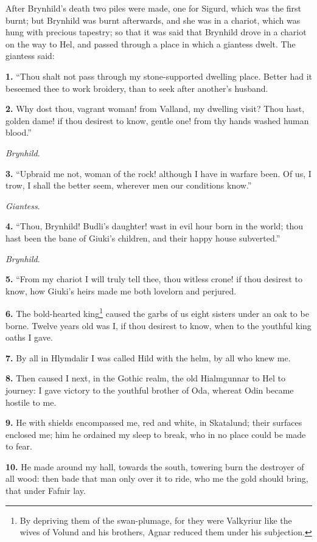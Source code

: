 
After Brynhild's death two piles were made, one for Sigurd, which was
the first burnt; but Brynhild was burnt afterwards, and she was in a
chariot, which was hung with precious tapestry; so that it was said
that Brynhild drove in a chariot on the way to Hel, and passed through
a place in which a giantess dwelt. The giantess said:

\textbf{1.} ``Thou shalt not pass through my stone-supported dwelling place.
Better had it beseemed thee to work broidery, than to seek after
another's husband.

\textbf{2.} Why dost thou, vagrant woman! from Valland, my dwelling visit?
Thou hast, golden dame! if thou desirest to know, gentle one! from thy
hands washed human blood.''

\emph{Brynhild}.

\textbf{3.} ``Upbraid me not, woman of the rock! although I have in warfare
been. Of us, I trow, I shall the better seem, wherever men our
conditions know.''

\emph{Giantess}.

\textbf{4.} ``Thou, Brynhild! Budli's daughter! wast in evil hour born in the
world; thou hast been the bane of Giuki's children, and their happy
house subverted.''

\emph{Brynhild}.

\textbf{5.} ``From my chariot I will truly tell thee, thou witless crone! if
thou desirest to know, how Giuki's heirs made me both lovelorn and
perjured.

\textbf{6.} The bold-hearted king\footnote{By depriving them of the swan-plumage, for they were
Valkyriur like the wives of Volund and his brothers, Agnar reduced
them under his subjection.} caused the garbs of us eight sisters
under an oak to be borne. Twelve years old was I, if thou desirest to
know, when to the youthful king oaths I gave.

\textbf{7.} By all in Hlymdalir I was called Hild with the helm, by all who
knew me.

\textbf{8.} Then caused I next, in the Gothic realm, the old Hialmgunnar to
Hel to journey: I gave victory to the youthful brother of Oda, whereat
Odin became hostile to me.

\textbf{9.} He with shields encompassed me, red and white, in Skatalund;
their surfaces enclosed me; him he ordained my sleep to break, who in
no place could be made to fear.

\textbf{10.} He made around my hall, towards the south, towering burn the
destroyer of all wood: then bade that man only over it to ride, who me
the gold should bring, that under Fafnir lay.

